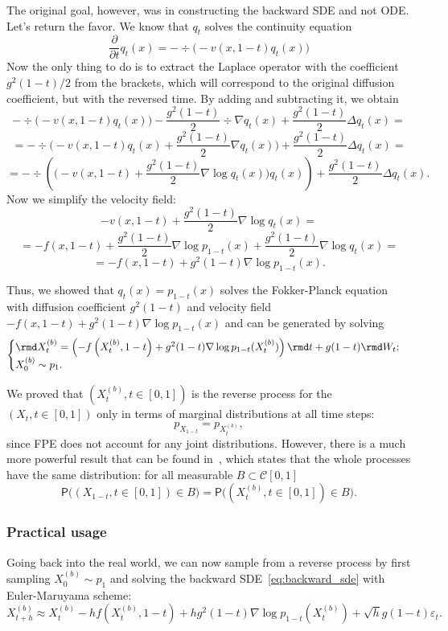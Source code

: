 The original goal, however, was in constructing the backward SDE and not ODE. Let's return the favor. We know that $q_t$ solves the continuity equation
\[
    \frac{\partial}{\partial t}q_t(x) = -\div\Big(-v(x, 1 - t)q_t(x)\Big)
\]
Now the only thing to do is to extract the Laplace operator with the coefficient $g^2(1 - t)/2$ from the brackets, which will correspond to the original diffusion coefficient, but with the reversed time. By adding and subtracting it, we obtain
\[
    -\div\Big(-v(x, 1 - t)q_t(x)\Big) - \frac{g^2(1-t)}{2} \div \nabla q_t(x) + \frac{g^2(1 - t)}{2} \Delta q_t(x) = 
\]
\[
    = -\div\Big(-v(x, 1 - t)q_t(x) + \frac{g^2(1 - t)}{2}\nabla q_t(x)\Big) + \frac{g^2(1 - t)}{2} \Delta q_t(x) = 
\]
\[
    = -\div\left(\Big(-v(x, 1 - t) + \frac{g^2(1 - t)}{2} \nabla \log q_t(x) \Big) q_t(x)\right) + \frac{g^2(1 - t)}{2} \Delta q_t(x).
\]
Now we simplify the velocity field:
\[
    -v(x, 1 - t) + \frac{g^2(1 - t)}{2} \nabla \log q_t(x) =
\]
\[
    = -f(x, 1 - t) + \frac{g^2(1 - t)}{2} \nabla \log p_{1 - t}(x) + \frac{g^2(1 - t)}{2} \nabla \log q_t(x) =
\]
\[
    = -f(x, 1 - t) + g^2(1 - t) \nabla \log p_{1 - t}(x).
\]

Thus, we showed that $q_t(x) = p_{1 - t}(x)$ solves the Fokker-Planck equation with diffusion coefficient $g^2(1 - t)$ and velocity field $-f(x, 1 - t) + g^2(1 - t)\nabla \log p_{1 - t}(x)$ and can be generated by solving
\begin{equation}\label{eq:backward_sde}
    \begin{cases}
    \rmd X^{(b)}_t = \left(-f\left(X^{(b)}_t, 1 -t\right) + g^2(1 - t) \nabla \log p_{1 - t}(X^{(b)}_t) \right)\rmd t + g(1 - t) \rmd W_t;\\
    X_0^{(b)} \sim p_1.
    \end{cases}
\end{equation}

We proved that $(X_t^{(b)}, t \in [0, 1])$ is the reverse process for the $(X_t, t \in [0, 1])$ only in terms of marginal distributions at all time steps:
\[
    p_{X_{1 - t}} = p_{X_t^{(b)}},
\]
since FPE does not account for any joint distributions. However, there is a much more powerful result that can be found in~\cite{anderson1982reverse}, which states that the whole processes have the same distribution: for all measurable $B \subset \mathcal{C}[0, 1]$
\[
    \mathsf{P}\Big((X_{1 - t}, t \in [0, 1]) \in B\Big) = \mathsf{P}\Big((X_t^{(b)}, t \in [0, 1]) \in B\Big).
\]

\subsubsection{Practical usage}
Going back into the real world, we can now sample from a reverse process by first sampling $X^{(b)}_0 \sim p_1$ and solving the backward SDE~\ref{eq:backward_sde} with Euler-Maruyama scheme:
\[
    X^{(b)}_{t + h} \approx X^{(b)}_t - h f(X^{(b)}_t, 1 - t) + h g^2(1 - t) \nabla \log p_{1 - t}(X_t^{(b)}) + \sqrt{h} g(1 - t) \varepsilon_t.
\]

